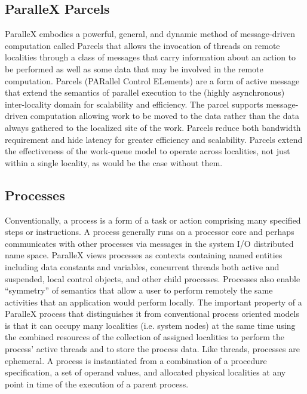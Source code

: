 \documentclass[floatfix]{revtex4}
\begin{document}
\subsection{ParalleX Parcels}
\label{sec_parcels}
ParalleX embodies a powerful, general, and dynamic method of
message-driven computation called Parcels that allows the invocation of threads on
remote localities through a class of messages that carry information
about an action to be performed as well as some data that may be
involved in the remote computation.
Parcels (PARallel Control ELements) are a form of active
message~\cite{activemessages} that extend
the semantics of parallel execution to the (highly asynchronous) inter-locality domain for
scalability and efficiency. The parcel supports message-driven
computation allowing work to be moved to the data rather than the data
always gathered to the localized site of the work. Parcels reduce both
bandwidth requirement and hide latency for greater efficiency and
scalability. Parcels extend the effectiveness of the work-queue model
to operate across localities, not just within a single locality, as
would be the case without them.

\subsection{Processes}
Conventionally, a process is a form of a task or action comprising many
specified steps or instructions. A process generally runs on a processor
core and perhaps communicates with other processes via messages in the
system I/O distributed name space. ParalleX views processes as contexts
containing named entities including data constants and variables,
concurrent threads both active and suspended, local control objects, and
other child processes. Processes also enable ``symmetry'' of semantics
that allow a user to perform remotely the same activities that an application
would perform locally. The important property of a ParalleX process
that distinguishes it from conventional process oriented models is that it can
occupy many localities (i.e. system nodes) at the same time
using the combined resources of the collection of assigned localities to
perform the process' active threads and to store the process data. Like
threads, processes are ephemeral. A process is instantiated from a combination
of a procedure specification, a set of operand values,
and allocated physical localities at any point in time of the execution
of a parent process. 
\end{document}
